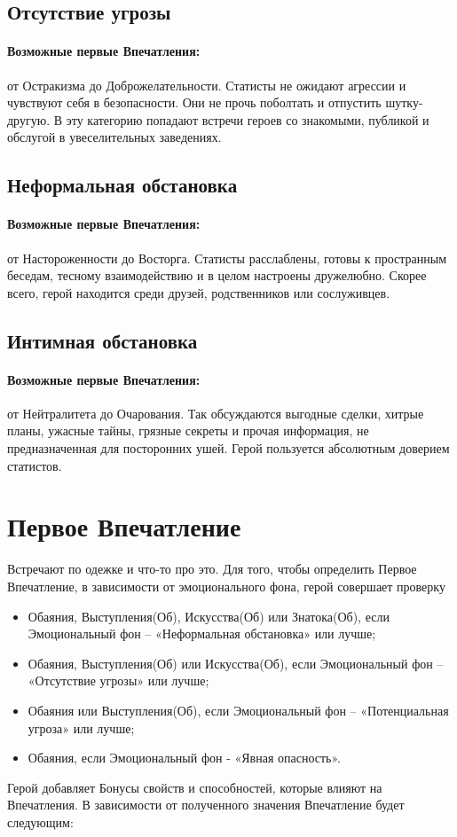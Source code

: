 \subsection{Отсутствие угрозы}
\paragraph{Возможные первые Впечатления:} от Остракизма до Доброжелательности.
\newline Статисты не ожидают агрессии и чувствуют себя в безопасности. Они не прочь поболтать и отпустить шутку-другую. В эту категорию попадают встречи героев со знакомыми, публикой и обслугой в увеселительных заведениях.

\subsection{Неформальная обстановка}
\paragraph{Возможные первые Впечатления:} от Настороженности до Восторга.
\newline Статисты расслаблены, готовы к пространным беседам, тесному взаимодействию и в целом настроены дружелюбно. Скорее всего, герой находится среди друзей, родственников или сослуживцев.

\subsection{Интимная обстановка}
\paragraph{Возможные первые Впечатления:} от Нейтралитета до Очарования.
\newline Так обсуждаются выгодные сделки, хитрые планы, ужасные тайны, грязные секреты и прочая информация, не предназначенная для посторонних ушей. Герой пользуется абсолютным доверием статистов.

\section{Первое Впечатление}
 Встречают по одежке и что-то про это.
Для того, чтобы определить Первое Впечатление, в зависимости от эмоционального фона, герой совершает проверку
\begin{itemize}
  \item Обаяния, Выступления(Об), Искусства(Об) или Знатока(Об), если Эмоциональный фон – «Неформальная обстановка» или лучше;
  \item Обаяния, Выступления(Об) или Искусства(Об), если Эмоциональный фон – «Отсутствие угрозы» или лучше;
  \item Обаяния или Выступления(Об), если Эмоциональный фон – «Потенциальная угроза» или лучше;
  \item Обаяния, если Эмоциональный фон - «Явная опасность».
\end{itemize}
Герой добавляет Бонусы свойств и способностей, которые влияют на Впечатления.
В зависимости от полученного значения Впечатление будет следующим:
